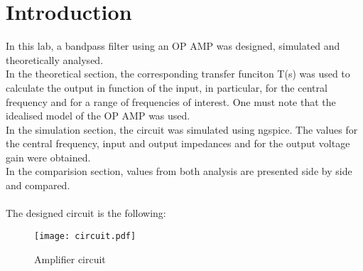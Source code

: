 \section{Introduction}
\label{sec:intro}
In this lab, a bandpass filter using an OP AMP was designed, simulated and theoretically analysed.\\
 In the theoretical section, the corresponding transfer funciton T(s) was used to calculate the output in function of the input, in particular, for the central frequency and for a range of frequencies of interest. One must note that the idealised model of the OP AMP was used. \\
 In the simulation section, the circuit was simulated using ngspice. The values for the central frequency, input and output impedances and for the output voltage gain were obtained.\\
In the comparision section, values from both analysis are presented side by side and compared.\\ \\
The designed circuit is the following:
\begin{figure} [!htb] 
  \texttt{[image: circuit.pdf]}
  \caption{Amplifier circuit}
  \label{fig:theoplots}
  \endminipage\hfill
\end{figure}


